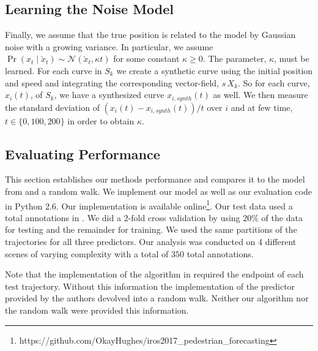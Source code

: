 \documentclass[letterpaper,10pt,conference]{ieeeconf}
\begin{document}
  \subsection{Learning the Noise Model}
  Finally, we assume that the true position is related to the model by Gaussian noise with a growing variance.
  In particular, we assume $\Pr( x_t \mid \check{x}_t) \sim \mathcal{N}( \check{x}_t , \kappa t)$ for some constant $\kappa \geq 0$.
  The parameter, $\kappa$, must be learned.
  For each curve in $S_k$ we create a synthetic curve using the initial position and speed and integrating the corresponding vector-field, $s\, X_k$.
  So for each curve, $x_i(t)$, of $S_k$, we have a synthesized curve $x_{i,synth}(t)$ as well.
  We then measure the standard deviation of $(x_i(t) - x_{i,synth}(t)) / t$ over $i$ and at few time, $t \in \{ 0, 100, 200 \}$ in order to obtain $\kappa$.
  
 \subsection{Evaluating Performance}
 
This section establishes our methods performance and compares it to the model from \cite{Kitani2012} and a random walk.
We implement our model as well as our evaluation code in Python 2.6. 
Our implementation is available online\footnote{https://github.com/OkayHughes/iros2017\_pedestrian\_forecasting}.
Our test data used a total  annotations in \cite{Robicquet2016}. 
We did a 2-fold cross validation by using $20\%$ of the data for testing and the remainder for training.
We used the same partitions of the trajectories for all three predictors.
Our analysis was conducted on 4 different scenes of varying complexity with a total of $350$ total annotations. 



Note that the implementation of the algorithm in \cite{Kitani2012} required the endpoint of each test trajectory. 
Without this information the implementation of the predictor provided by the authors devolved into a random walk.
Neither our algorithm nor the random walk were provided this information.
\end{document}
